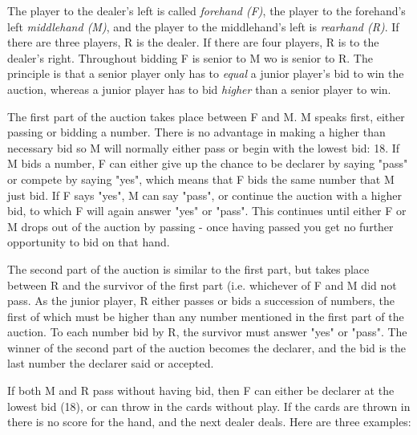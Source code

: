 \documentclass[letter]{article}
\begin{document}
  The player to the dealer's left is called \emph{forehand (F)}, the player to
  the forehand's left \emph{middlehand (M)}, and the player to the middlehand's
  left is \emph{rearhand (R)}. If there are three players, R is the dealer. If
  there are four players, R is to the dealer's right. Throughout bidding F is
  senior to M wo is senior to R. The principle is that a senior player only has
  to \emph{equal} a junior player's bid to win the auction, whereas a junior
  player has to bid \emph{higher} than a senior player to win.

  The first part of the auction takes place between F and M. M speaks first,
  either passing or bidding a number. There is no advantage in making a higher
  than necessary bid so M will normally either pass or begin with the lowest
  bid: 18. If M bids a number, F can either give up the chance to be declarer by
  saying "pass" or compete by saying "yes", which means that F bids the same
  number that M just bid. If F says "yes", M can say "pass", or continue the
  auction with a higher bid, to which F will again answer "yes" or "pass".
  This continues until either F or M drops out of the auction by passing - once
  having passed you get no further opportunity to bid on that hand. 

  The second part of the auction is similar to the first part, but takes place
  between R and the survivor of the first part (i.e. whichever of F and M did
  not pass. As the junior player, R either passes or bids a succession of
  numbers, the first of which must be higher than any number mentioned in the
  first part of the auction. To each number bid by R, the survivor must answer
  "yes" or "pass". The winner of the second part of the auction becomes the
  declarer, and the bid is the last number the declarer said or accepted.

  If both M and R pass without having bid, then F can either be declarer at the
  lowest bid (18), or can throw in the cards without play. If the cards are
  thrown in there is no score for the hand, and the next dealer deals. Here are
  three examples:
\end{document}
